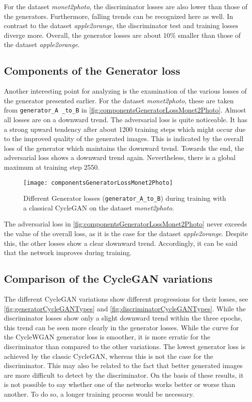 \documentclass[fleqn,10pt]{SelfArx} %
\begin{document}
For the dataset \textit{monet2photo}, the discriminator losses are also lower than those of the generators. Furthermore, falling trends can be recognized here as well. In contrast to the dataset \textit{apple2orange}, the discriminator test and training losses diverge more. Overall, the generator losses are about 10\% smaller than those of the dataset \textit{apple2orange}.

\subsection{Components of the Generator loss}
Another interesting point for analyzing is the examination of the various losses of the generator presented earlier. For the dataset \textit{monet2photo}, these are taken from \texttt{generator\_A \_to\_B} in \autoref{fig:componentsGeneratorLossMonet2Photo}. Almost all losses are on a downward trend. The adversarial loss is quite noticeable. It has a strong upward tendency after about 1200 training steps which might occur due to the improved quality of the generated images. This is indicated by the overall loss of the generator which maintains the downward trend. Towards the end, the adversarial loss shows a downward trend again. Nevertheless, there is a global maximum at training step 2550.

\begin{figure}[htb] 
	\centering 
	\texttt{[image: componentsGeneratorLossMonet2Photo]}
	\caption{Different Generator losses (\texttt{generator\_A\_to\_B}) during training with a classical Cycle\ac{GAN} on the dataset \textit{monet2photo}.}
	\label{fig:componentsGeneratorLossMonet2Photo}
\end{figure}

The adversarial loss in \autoref{fig:componentsGeneratorLossMonet2Photo} never exceeds the value of the overall loss, as it is the case for the dataset \textit{apple2orange}. Despite this, the other losses show a clear downward trend. Accordingly, it can be said that the network improves during training.

\subsection{Comparison of the Cycle\ac{GAN} variations}
The different Cycle\ac{GAN} variations show different progressions for their losses, see \autoref{fig:generatorCycleGANTypes} and \autoref{fig:discriminatorCycleGANTypes}. While the discriminator losses show only a slight downward trend within the three epochs, this trend can be seen more clearly in the generator losses. While the curve for the Cycle\ac{WGAN} generator loss is smoother, it is more erratic for the discriminator than compared to the other variations. The lowest generator loss is achieved by the classic Cycle\ac{GAN}, whereas this is not the case for the discriminator. This may also be related to the fact that better generated images are more difficult to detect by the discriminator. On the basis of these results, it is not possible to say whether one of the networks works better or worse than another. To do so, a longer training process would be necessary. 
\end{document}
